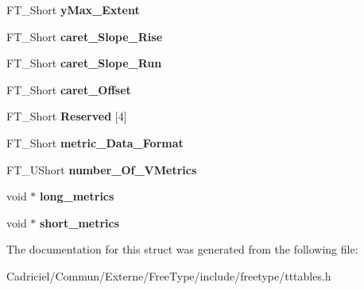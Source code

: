 \begin{DoxyCompactItemize}
\item 
\hypertarget{struct_t_t___vert_header___af6927e95c1dfbe90c2e76b1eef521d53}{F\-T\-\_\-\-Short {\bfseries y\-Max\-\_\-\-Extent}}\label{struct_t_t___vert_header___af6927e95c1dfbe90c2e76b1eef521d53}

\item 
\hypertarget{struct_t_t___vert_header___a3218533a7d8ac5a8ebd70a970cbdbbcc}{F\-T\-\_\-\-Short {\bfseries caret\-\_\-\-Slope\-\_\-\-Rise}}\label{struct_t_t___vert_header___a3218533a7d8ac5a8ebd70a970cbdbbcc}

\item 
\hypertarget{struct_t_t___vert_header___a98ff91b532d827440f7140d3071d473d}{F\-T\-\_\-\-Short {\bfseries caret\-\_\-\-Slope\-\_\-\-Run}}\label{struct_t_t___vert_header___a98ff91b532d827440f7140d3071d473d}

\item 
\hypertarget{struct_t_t___vert_header___a89ff9369f61dc5b770cde0eda954d402}{F\-T\-\_\-\-Short {\bfseries caret\-\_\-\-Offset}}\label{struct_t_t___vert_header___a89ff9369f61dc5b770cde0eda954d402}

\item 
\hypertarget{struct_t_t___vert_header___a54930b56bb8be0a8eb22753a9242fc5f}{F\-T\-\_\-\-Short {\bfseries Reserved} \mbox{[}4\mbox{]}}\label{struct_t_t___vert_header___a54930b56bb8be0a8eb22753a9242fc5f}

\item 
\hypertarget{struct_t_t___vert_header___aa7c3983f62f7bf736eaaaae684b65dd7}{F\-T\-\_\-\-Short {\bfseries metric\-\_\-\-Data\-\_\-\-Format}}\label{struct_t_t___vert_header___aa7c3983f62f7bf736eaaaae684b65dd7}

\item 
\hypertarget{struct_t_t___vert_header___a4ca6fe9cdd12fbc9a1129c4fbf6bddd1}{F\-T\-\_\-\-U\-Short {\bfseries number\-\_\-\-Of\-\_\-\-V\-Metrics}}\label{struct_t_t___vert_header___a4ca6fe9cdd12fbc9a1129c4fbf6bddd1}

\item 
\hypertarget{struct_t_t___vert_header___ac789245d0d6243bc965ad43702bdc671}{void $\ast$ {\bfseries long\-\_\-metrics}}\label{struct_t_t___vert_header___ac789245d0d6243bc965ad43702bdc671}

\item 
\hypertarget{struct_t_t___vert_header___ad5e875c19a02b0f6777db1c122bff2f3}{void $\ast$ {\bfseries short\-\_\-metrics}}\label{struct_t_t___vert_header___ad5e875c19a02b0f6777db1c122bff2f3}

\end{DoxyCompactItemize}


The documentation for this struct was generated from the following file\-:\begin{DoxyCompactItemize}
\item 
Cadriciel/\-Commun/\-Externe/\-Free\-Type/include/freetype/tttables.\-h\end{DoxyCompactItemize}
